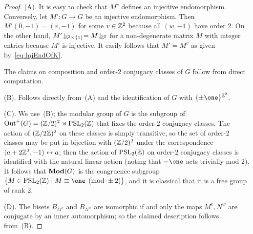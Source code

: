 \documentclass{amsart}
\begin{document}
\begin{proof}
  (A). It is easy to check that $M^v$ defines an injective
  endomorphism. Conversely, let $M'\colon G\to G$ be an injective
  endomorphism. Then $M'(0,-1)=(v,-1)$ for some $v\in{\mathbb Z}^2$ because all
  $(w,-1)$ have order $2$. On the other hand,
  $M'\!\downharpoonleft_{\!{\mathbb Z}^2\times\{1\}}= M\!\downharpoonleft_{\!{\mathbb Z}^2}$ for a
  non-degenerate matrix $M$ with integer entries because $M'$ is
  injective. It easily follows that $M'=M^v$ as given
  by~\eqref{eq:InjEndOfK}.

  The claims on composition and order-$2$ conjugacy classes of $G$
  follow from direct computation.

  (B). Follows directly from~(A) and the identification of $G$ with
  $\{\pm\one\}^{\Z^2}$.

  (C). We use~(B); the modular group of $G$ is the subgroup of
  $\operatorname{Out}^+(G)=({\mathbb Z}/2)^2\rtimes\operatorname{PSL}_2({\mathbb Z})$ that fixes the
  order-$2$ conjugacy classes. The action of $({\mathbb Z}/2{\mathbb Z})^2$ on these
  classes is simply transitive, so the set of order-$2$ classes may be
  put in bijection with $({\mathbb Z}/2)^2$ under the correspondence
  $(a+2{\mathbb Z}^2,-1)\leftrightarrow a$; then the action of
  $\operatorname{PSL}_2({\mathbb Z})$ on order-$2$ conjugacy classes is
  identified with the natural linear action (noting that $-\one$ acts
  trivially mod $2$). It follows that $\mathbf{\relax Mod}(G)$ is the congruence
  subgroup
  $\{M\in\operatorname{PSL}_2(\Z)\mid M\equiv\one\pmod{\pm2}\}$, and
  it is classical that it is a free group of rank $2$.

  (D). The bisets $B_{M^v}$ and $B_{N^w}$ are isomorphic if and only
  the maps $M^v,N^w$ are conjugate by an inner automorphism; so the
  claimed description follows from~(B).
\end{proof}
\end{document}
